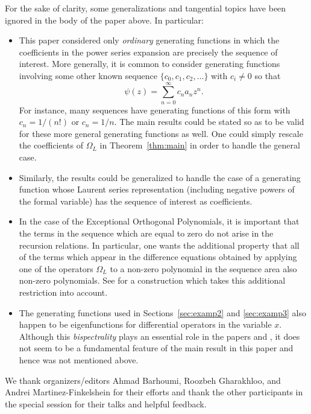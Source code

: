 \documentclass{amsart}
\theoremstyle{definition}
\theoremstyle{remark}
\numberwithin{equation}{section}
\begin{document}
For the sake of clarity, some generalizations and tangential topics
have been ignored in the body of the paper above.  In particular:
\begin{itemize}
\item This paper considered only \textit{ordinary} generating
functions in which the coefficients in the power series expansion are precisely
the sequence of interest.  More generally, it is common to consider
generating functions involving some other known sequence
$\{c_0,c_1,c_2,\ldots\}$ with $c_i\not=0$ so that
$$
\psi(z)=\sum_{n=0}^{\infty} c_na_n z^n.
$$
For instance, many sequences have generating functions of this form
with $c_n=1/(n!)$ or $c_n=1/n$.  The main results could be stated so
as to be valid for these more general generating functions as well.
One could simply rescale the coefficients of $\Omega_L$
in Theorem~\ref{thm:main} in order to handle the general case.
\item 
Similarly, the results could be generalized to handle the case of a
generating function whose Laurent series representation (including
negative powers of the formal variable) has the sequence of interest
as coefficients.
\item In the case of the Exceptional Orthogonal Polynomials, it is
  important that the terms in the sequence which are equal to zero do
  not arise in the recursion relations.  In particular, one wants the
  additional property that all of the terms which appear in the
  difference equations obtained by applying one of the operators
  $\Omega_L$ to a non-zero polynomial in the sequence area also
  non-zero polynomials.  See
  \cite{MilsonKasman2020} for a construction which takes this
  additional restriction into account.
\item The generating functions used in Sections~\ref{sec:examp2} and
  \ref{sec:examp3} also happen to be eigenfunctions for differential
  operators in the variable $x$.  Although this \textit{bispectrality} plays an essential
  role in the papers 
  \cite{MilsonKasman2020} and \cite{Wilson1993}, it does not seem to be a fundamental feature
  of the main result in this paper and hence was not mentioned above.
\end{itemize}
We thank organizers/editors Ahmad Barhoumi, Roozbeh Gharakhloo, and Andrei Martinez-Finkelshein 
for their efforts and thank the other participants in the special session for their talks and
helpful feedback.



\end{document}
